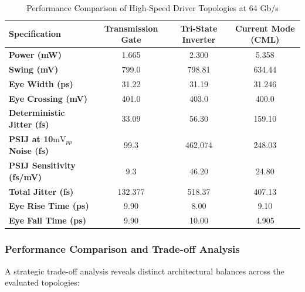 \begin{table}[H]
    \centering
    \caption{Performance Comparison of High-Speed Driver Topologies at 64 Gb/s}
    \label{tab:comparison_summary}
    \renewcommand{\arraystretch}{1.3}
    \setlength{\tabcolsep}{8pt}
    \begin{tabular}{|l|c|c|c|}
        \hline
        \textbf{Specification} & \textbf{Transmission Gate} & \textbf{Tri-State Inverter} & \textbf{Current Mode (CML)} \\ \hline
        \textbf{Power (mW)} & 1.665 & 2.300 & 5.358 \\ \hline
        \textbf{Swing (mV)} & 799.0 & 798.81 & 634.44 \\ \hline
        \textbf{Eye Width (ps)} & 31.22 & 31.19 & 31.246 \\ \hline
        \textbf{Eye Crossing (mV)} & 401.0 & 403.0 & 400.0 \\ \hline
        \textbf{Deterministic Jitter (fs)} & 33.09 & 56.30 & 159.10 \\ \hline
        \textbf{PSIJ at 10$\text{mV}_{pp}$ Noise (fs)} & 99.3 & 462.074 & 248.03 \\ \hline
        \textbf{PSIJ Sensitivity (fs/mV)} & 9.3 & 46.20 & 24.80 \\ \hline
        \textbf{Total Jitter (fs)} & 132.377 & 518.37 & 407.13 \\ \hline
        \textbf{Eye Rise Time (ps)} & 9.90 & 8.00 & 9.10 \\ \hline
        \textbf{Eye Fall Time (ps)} & 9.90 & 10.00 & 4.905 \\ \hline
    \end{tabular}
\end{table}

\subsubsection*{Performance Comparison and Trade-off Analysis}

A strategic trade-off analysis reveals distinct architectural balances across the evaluated topologies:

